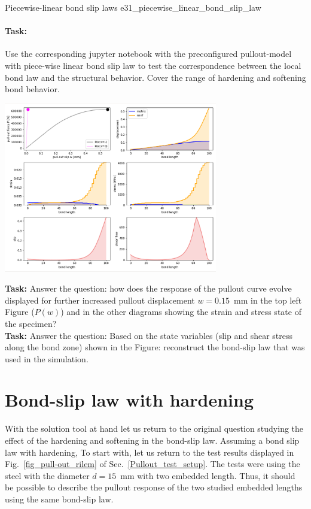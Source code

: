 \documentclass[main.tex]{subfiles}
\begin{document}
\begin{bmcsex}{Piecewise-linear bond slip laws}
{e31_piecewise_linear_bond_slip_law}
\paragraph{Task:} Use the corresponding jupyter notebook with the preconfigured pullout-model with piece-wise linear bond slip law to test the correspondence between the local bond law and the structural behavior. Cover the range of hardening and softening bond behavior.\\
\begin{center}
\includegraphics[width=0.7\textwidth]{fig/Lecture03/multilinear_bond.png}
\end{center}
\textbf{Task:} Answer the question: how does the response of the pullout curve evolve displayed for further increased pullout displacement $w = 0.15$~mm in the top left Figure ($P(w)$) and in the other diagrams showing the strain and stress state of the specimen?\\
\textbf{Task:} Answer the question: Based on the state variables (slip and shear stress along the bond zone) shown in the Figure: reconstruct the bond-slip law that was used in the simulation.
\end{bmcsex}

\section{Bond-slip law with hardening}
\label{SEC:bond-slip-hardening}

With the solution tool at hand let us return to the original question studying the effect of the hardening and softening in the bond-slip law. Assuming a bond slip law with hardening, 
To start with, let us return to the test results displayed in Fig.~\ref{fig_pull-out_rilem} of Sec.~\ref{Pullout_test_setup}. The tests were using the steel with the diameter $d=15$~mm with two embedded length. Thus, it should be possible to describe the pullout response of the two studied embedded lengths using the same bond-slip law.
\end{document}
